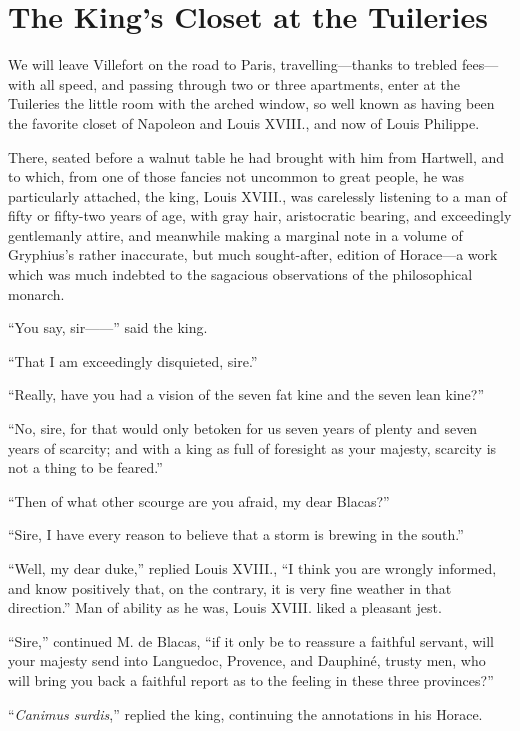 \chapter{The King’s Closet at the Tuileries}

We will leave Villefort on the road to Paris, travelling—thanks to
trebled fees—with all speed, and passing through two or three
apartments, enter at the Tuileries the little room with the arched
window, so well known as having been the favorite closet of Napoleon
and Louis XVIII., and now of Louis Philippe.

There, seated before a walnut table he had brought with him from
Hartwell, and to which, from one of those fancies not uncommon to great
people, he was particularly attached, the king, Louis XVIII., was
carelessly listening to a man of fifty or fifty-two years of age, with
gray hair, aristocratic bearing, and exceedingly gentlemanly attire,
and meanwhile making a marginal note in a volume of Gryphius’s rather
inaccurate, but much sought-after, edition of Horace—a work which was
much indebted to the sagacious observations of the philosophical
monarch.

“You say, sir——” said the king.

“That I am exceedingly disquieted, sire.”

“Really, have you had a vision of the seven fat kine and the seven lean
kine?”

“No, sire, for that would only betoken for us seven years of plenty and
seven years of scarcity; and with a king as full of foresight as your
majesty, scarcity is not a thing to be feared.”

“Then of what other scourge are you afraid, my dear Blacas?”

“Sire, I have every reason to believe that a storm is brewing in the
south.”

“Well, my dear duke,” replied Louis XVIII., “I think you are wrongly
informed, and know positively that, on the contrary, it is very fine
weather in that direction.” Man of ability as he was, Louis XVIII.
liked a pleasant jest.

“Sire,” continued M. de Blacas, “if it only be to reassure a faithful
servant, will your majesty send into Languedoc, Provence, and Dauphiné,
trusty men, who will bring you back a faithful report as to the feeling
in these three provinces?”

“\textit{Canimus surdis},” replied the king, continuing the annotations in his
Horace.

